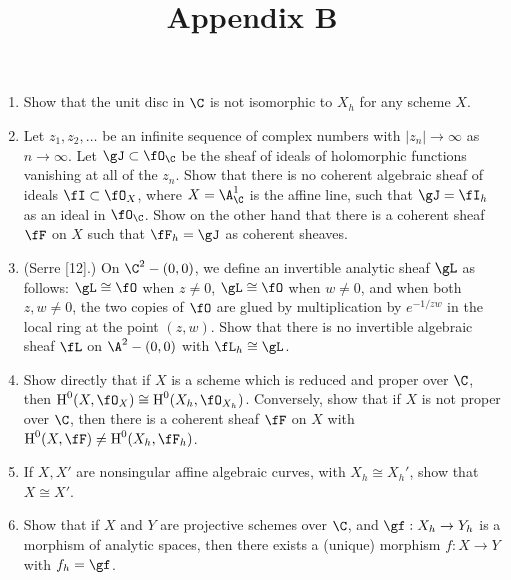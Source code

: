 \documentclass[a4paper]{article}
\title{Appendix B}
\begin{document}
\maketitle

\begin{enumerate} [label=\textbf{\arabic*.}, leftmargin=0em]

      \item Show that the unit disc in $\C$ is not isomorphic to $X_h$ for any scheme $X$.

      \item Let $z_1, z_2, \dots$ be an infinite sequence of complex numbers with $|z_n| \to \infty$ as $n \to \infty$.
      Let $\gJ \subset \fO_{\C}$ be the sheaf of ideals of holomorphic functions vanishing at all of the $z_n$.
      Show that there is no coherent algebraic sheaf of ideals $\fI \subset \fO_X$, where $X = \A_\C^1$ is the affine line, such that $\gJ = \fI_h$ as an ideal in $\fO_\C$.
      Show on the other hand that there is a coherent sheaf $\fF$ on $X$ such that $\fF_h = \gJ$ as coherent sheaves.

      \item (Serre [12].) On $\C^2 - (0, 0)$, we define an invertible analytic sheaf $\gL$ as follows: $\gL \cong \fO$ when $z \neq 0$, $\gL \cong \fO$ when $w \neq 0$, and when both $z, w \neq 0$, the two copies of $\fO$ are glued by multiplication by $e^{-1/zw}$ in the local ring at the point $(z, w)$.
      Show that there is no invertible algebraic sheaf $\fL$ on $\A^2 - (0, 0)$ with $\fL_h \cong \gL$.

      \item Show directly that if $X$ is a scheme which is reduced and proper over $\C$, then $\cH^0(X, \fO_X) \cong \cH^0(X_h, \fO_{X_h})$.
      Conversely, show that if $X$ is not proper over $\C$, then there is a coherent sheaf $\fF$ on $X$ with $\cH^0(X, \fF) \neq \cH^0(X_h, \fF_h)$.

      \item If $X, X'$ are nonsingular affine algebraic curves, with $X_h \cong X_h'$, show that $X \cong X'$.

      \item Show that if $X$ and $Y$ are projective schemes over $\C$, and $\gf : X_h \to Y_h$ is a morphism of analytic spaces, then there exists a (unique) morphism $f : X \to Y$ with $f_h = \gf$.

\end{enumerate}
\end{document}
